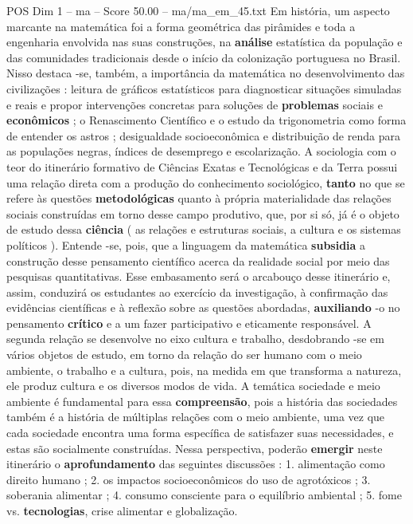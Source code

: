 \begin{textsample}{POS Dim 1 – ma – Score 50.00 – ma/ma\_em\_45.txt}
Em história, um aspecto marcante na matemática foi a forma geométrica das pirâmides e toda a engenharia envolvida nas suas construções, na \textbf{análise} estatística da população e das comunidades tradicionais desde o início da colonização portuguesa no Brasil.
Nisso destaca -se, também, a importância da matemática no desenvolvimento das civilizações : leitura de gráficos estatísticos para diagnosticar situações simuladas e reais e propor intervenções concretas para soluções de \textbf{problemas} sociais e \textbf{econômicos} ; o Renascimento Científico e o estudo da trigonometria como forma de entender os astros ; desigualdade socioeconômica e distribuição de renda para as populações negras, índices de desemprego e escolarização.
A sociologia com o teor do itinerário formativo de Ciências Exatas e Tecnológicas e da Terra possui uma relação direta com a produção do conhecimento sociológico, \textbf{tanto} no que se refere às questões \textbf{metodológicas} quanto à própria materialidade das relações sociais construídas em torno desse campo produtivo, que, por si só, já é o objeto de estudo dessa \textbf{ciência} ( as relações e estruturas sociais, a cultura e os sistemas políticos ).
Entende -se, pois, que a linguagem da matemática \textbf{subsidia} a construção desse pensamento científico acerca da realidade social por meio das pesquisas quantitativas.
Esse embasamento será o arcabouço desse itinerário e, assim, conduzirá os estudantes ao exercício da investigação, à confirmação das evidências científicas e à reflexão sobre as questões abordadas, \textbf{auxiliando} -o no pensamento \textbf{crítico} e a um fazer participativo e eticamente responsável.
A segunda relação se desenvolve no eixo cultura e trabalho, desdobrando -se em vários objetos de estudo, em torno da relação do ser humano com o meio ambiente, o trabalho e a cultura, pois, na medida em que transforma a natureza, ele produz cultura e os diversos modos de vida.
A temática sociedade e meio ambiente é fundamental para essa \textbf{compreensão}, pois a história das sociedades também é a história de múltiplas relações com o meio ambiente, uma vez que cada sociedade encontra uma forma específica de satisfazer suas necessidades, e estas são socialmente construídas.
Nessa perspectiva, poderão \textbf{emergir} neste itinerário o \textbf{aprofundamento} das seguintes discussões : 1. alimentação como direito humano ; 2. os impactos socioeconômicos do uso de agrotóxicos ; 3. soberania alimentar ; 4. consumo consciente para o equilíbrio ambiental ; 5. fome vs. \textbf{tecnologias}, crise alimentar e globalização.

\end{textsample}
